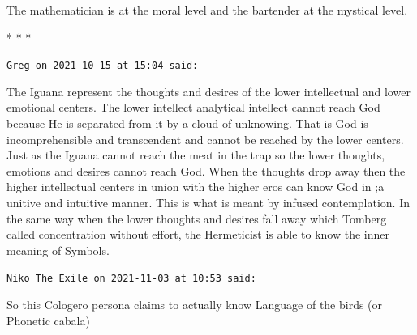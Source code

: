 The mathematician is at the moral level and the bartender at the mystical level.



\begin{center}* * *\end{center}

\begin{footnotesize}
\begin{sffamily}
\texttt{Greg on 2021-10-15 at 15:04 said:}

The Iguana represent the thoughts and desires of the lower intellectual and lower emotional centers. The lower intellect analytical intellect cannot reach God because He is separated from it by a cloud of unknowing. That is God is incomprehensible and transcendent and cannot be reached by the lower centers. Just as the Iguana cannot reach the meat in the trap so the lower thoughts, emotions and desires cannot reach God. When the thoughts drop away then the higher intellectual centers in union with the higher eros can know God in ;a unitive and intuitive manner. This is what is meant by infused contemplation. In the same way when the lower thoughts and desires fall away which Tomberg called concentration without effort, the Hermeticist is able to know the inner meaning of Symbols.

\hfill

\texttt{Niko The Exile on 2021-11-03 at 10:53 said:}

So this Cologero persona claims to actually know Language of the birds (or Phonetic cabala)


\hfill

\end{sffamily}
\end{footnotesize}

